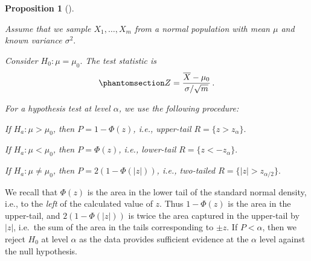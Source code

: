 \documentclass[
  a4paper,
  DIV=11,
  numbers=noendperiod,
  oneside]{scrreprt}
\theoremstyle{definition}
\theoremstyle{definition}
\theoremstyle{plain}
\newtheorem{proposition}{Proposition}[chapter]
\theoremstyle{plain}
\theoremstyle{definition}
\theoremstyle{remark}
\begin{document}
\begin{proposition}[]\protect\hypertarget{prp-htest-norm-known-var}{}\label{prp-htest-norm-known-var}

Assume that we sample \(X_1, \dots, X_m\) from a normal population with
mean \(\mu\) and known variance \(\sigma^2.\)

Consider \(H_0 : \mu = \mu_0.\) The test statistic is
\begin{equation}\phantomsection\label{eq-htest-norm-known-var-T}{
 Z = \frac{\overline{X} - \mu_0}{\sigma / \sqrt{m}}\,.
}\end{equation}

For a hypothesis test at level \(\alpha\), we use the following
procedure:

If \(H_a : \mu > \mu_0\), then \(P = 1 - \Phi(z)\), i.e., upper-tail
\(R = \{z > z_{\alpha}\}.\)

If \(H_a : \mu < \mu_0\), then \(P = \Phi(z)\), i.e., lower-tail
\(R = \{z < - z_{\alpha}\}.\)

If \(H_a : \mu \neq \mu_0\), then \(P = 2(1-\Phi(|z|))\), i.e.,
two-tailed \(R = \{|z| > z_{\alpha/2}\}.\)

\end{proposition}

We recall that \(\Phi(z)\) is the area in the lower tail of the standard
normal density, i.e., to the \emph{left} of the calculated value of
\(z.\) Thus \(1 - \Phi(z)\) is the area in the upper-tail, and
\(2(1 - \Phi(|z|))\) is twice the area captured in the upper-tail by
\(|z|\), i.e.~the sum of the area in the tails corresponding to
\(\pm z.\) If \(P < \alpha\), then we reject \(H_0\) at level \(\alpha\)
as the data provides sufficient evidence at the \(\alpha\) level against
the null hypothesis.
\end{document}
